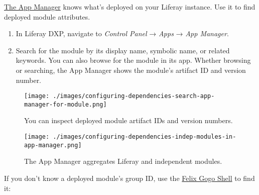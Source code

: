 \href{/docs/7-2/user/-/knowledge_base/u/managing-and-configuring-apps\#using-the-app-manager}{The
App Manager} knows what's deployed on your Liferay instance. Use it to
find deployed module attributes.

\begin{enumerate}
\def\labelenumi{\arabic{enumi}.}
\item
  In Liferay DXP, navigate to \emph{Control Panel} → \emph{Apps} →
  \emph{App Manager}.
\item
  Search for the module by its display name, symbolic name, or related
  keywords. You can also browse for the module in its app. Whether
  browsing or searching, the App Manager shows the module's artifact ID
  and version number.
\end{enumerate}

\begin{figure}
\centering
\texttt{[image: ./images/configuring-dependencies-search-app-manager-for-module.png]}
\caption{You can inspect deployed module artifact IDs and version
numbers.}
\end{figure}

\begin{figure}
\centering
\texttt{[image: ./images/configuring-dependencies-indep-modules-in-app-manager.png]}
\caption{The App Manager aggregates Liferay and independent modules.}
\end{figure}

If you don't know a deployed module's group ID, use the
\href{/docs/7-2/customization/-/knowledge_base/c/using-the-felix-gogo-shell}{Felix
Gogo Shell} to find it:

